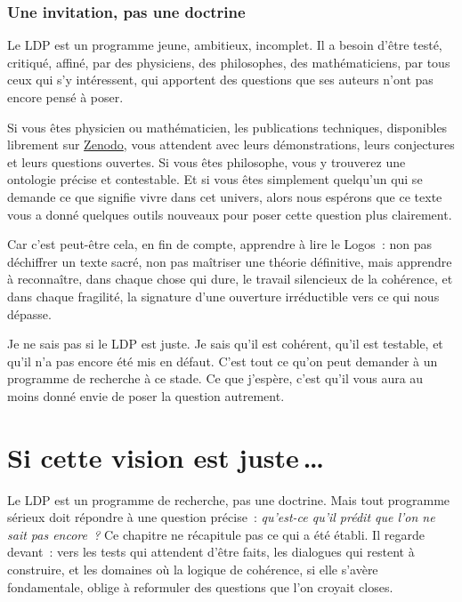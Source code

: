 \documentclass[12pt, a4paper, openright]{book}
\begin{document}
\subsection*{Une invitation, pas une doctrine}

Le LDP est un programme jeune, ambitieux, incomplet. Il a besoin d'être testé, critiqué, affiné, par des physiciens, des philosophes, des mathématiciens, par tous ceux qui s'y intéressent, qui apportent des questions que ses auteurs n'ont pas encore pensé à poser.

\medskip

Si vous êtes physicien ou mathématicien, les publications techniques, disponibles librement sur \href{https://zenodo.org}{Zenodo}, vous attendent avec leurs démonstrations, leurs conjectures et leurs questions ouvertes. Si vous êtes philosophe, vous y trouverez une ontologie précise et contestable. Et si vous êtes simplement quelqu'un qui se demande ce que signifie vivre dans cet univers, alors nous espérons que ce texte vous a donné quelques outils nouveaux pour poser cette question plus clairement.

\medskip

Car c'est peut-être cela, en fin de compte, apprendre à lire le Logos~: non pas déchiffrer un texte sacré, non pas maîtriser une théorie définitive, mais apprendre à reconnaître, dans chaque chose qui dure, le travail silencieux de la cohérence, et dans chaque fragilité, la signature d'une ouverture irréductible vers ce qui nous dépasse. 

\medskip

Je ne sais pas si le LDP est juste. Je sais qu'il est cohérent, qu'il est testable, et qu'il n'a pas encore été mis en défaut. C'est tout ce qu'on peut demander à un programme de recherche à ce stade. Ce que j'espère, c'est qu'il vous aura au moins donné envie de poser la question autrement.

\chapter{Si cette vision est juste\texorpdfstring{\,\ldots}{...}}

Le LDP est un programme de recherche, pas une doctrine. Mais tout programme sérieux doit répondre à une question précise~: \emph{qu'est-ce qu'il prédit que l'on ne sait pas encore~?} Ce chapitre ne récapitule pas ce qui a été établi. Il regarde devant~: vers les tests qui attendent d'être faits, les dialogues qui restent à construire, et les domaines où la logique de cohérence, si elle s'avère fondamentale, oblige à reformuler des questions que l'on croyait closes.
\end{document}
